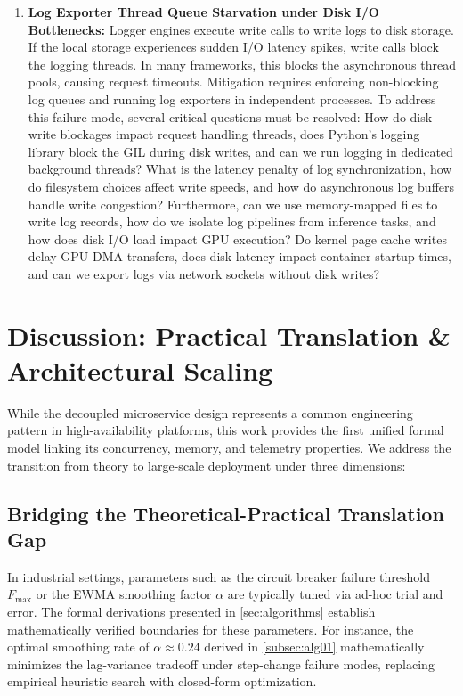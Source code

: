 \documentclass[11pt,a4paper]{article}
\theoremstyle{plain}
\theoremstyle{definition}
\theoremstyle{remark}
\begin{document}
\begin{enumerate}[label=\textbf{MF\arabic*.}]
    \item \textbf{Log Exporter Thread Queue Starvation under Disk I/O Bottlenecks:} 
    Logger engines execute write calls to write logs to disk storage. If the local storage experiences sudden I/O latency spikes, write calls block the logging threads. In many frameworks, this blocks the asynchronous thread pools, causing request timeouts.
    Mitigation requires enforcing non-blocking log queues and running log exporters in independent processes.
    To address this failure mode, several critical questions must be resolved: How do disk write blockages impact request handling threads, does Python's logging library block the GIL during disk writes, and can we run logging in dedicated background threads? What is the latency penalty of log synchronization, how do filesystem choices affect write speeds, and how do asynchronous log buffers handle write congestion? Furthermore, can we use memory-mapped files to write log records, how do we isolate log pipelines from inference tasks, and how does disk I/O load impact GPU execution? Do kernel page cache writes delay GPU DMA transfers, does disk latency impact container startup times, and can we export logs via network sockets without disk writes?

\end{enumerate}
\section{Discussion: Practical Translation \& Architectural Scaling}\label{sec:discussion}
While the decoupled microservice design represents a common engineering pattern in high-availability platforms, this work provides the first unified formal model linking its concurrency, memory, and telemetry properties. We address the transition from theory to large-scale deployment under three dimensions:

\subsection{Bridging the Theoretical-Practical Translation Gap}
In industrial settings, parameters such as the circuit breaker failure threshold $F_{\max}$ or the EWMA smoothing factor $\alpha$ are typically tuned via ad-hoc trial and error. The formal derivations presented in \cref{sec:algorithms} establish mathematically verified boundaries for these parameters. For instance, the optimal smoothing rate of $\alpha \approx 0.24$ derived in \cref{subsec:alg01} mathematically minimizes the lag-variance tradeoff under step-change failure modes, replacing empirical heuristic search with closed-form optimization.
\end{document}
